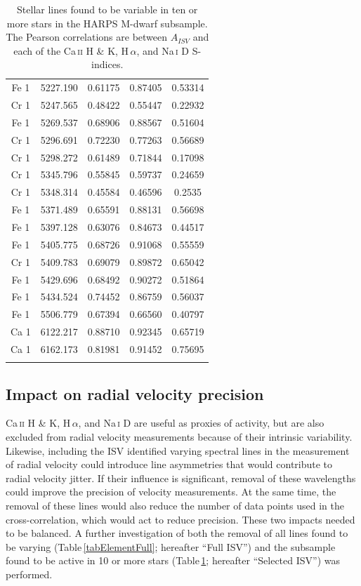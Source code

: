 \begin{longtable}{|c|c|c|c|c|}
Fe 1 & 5227.190 & 0.61175 & 0.87405 & 0.53314 \\   
Cr 1 & 5247.565 & 0.48422 & 0.55447 & 0.22932 \\  
Fe 1 & 5269.537 & 0.68906 & 0.88567 & 0.51604 \\  
Cr 1 & 5296.691 & 0.72230 & 0.77263 & 0.56689 \\   
Cr 1 & 5298.272 & 0.61489 & 0.71844 & 0.17098 \\  
Cr 1 & 5345.796 & 0.55845 & 0.59737 & 0.24659 \\  
Cr 1 & 5348.314 & 0.45584 & 0.46596 & 0.2535 \\   
Fe 1 & 5371.489 & 0.65591 & 0.88131 & 0.56698 \\  
Fe 1 & 5397.128 & 0.63076 & 0.84673 & 0.44517 \\  
Fe 1 & 5405.775 & 0.68726 & 0.91068 & 0.55559 \\  
Cr 1 & 5409.783 & 0.69079 & 0.89872 & 0.65042 \\  
Fe 1 & 5429.696 & 0.68492 & 0.90272 & 0.51864 \\  
Fe 1 & 5434.524 & 0.74452 & 0.86759 & 0.56037 \\  
Fe 1 & 5506.779 & 0.67394 & 0.66560 & 0.40797 \\   
Ca 1 & 6122.217 & 0.88710 & 0.92345 & 0.65719 \\   
Ca 1 & 6162.173 & 0.81981 & 0.91452 & 0.75695 \\ 
\hline
\caption{Stellar lines found to be variable in ten or more stars in the HARPS M-dwarf subsample. The Pearson correlations are between $A_{ISV}$ and each of the Ca\,\textsc{ii} H \& K, H\,\textsc{$\alpha$}, and Na\,\textsc{i} D S-indices.}
\label{tabISVlines}
\end{longtable}

\subsection{Impact on radial velocity precision}
Ca\,\textsc{ii} H \& K, H\,\textsc{$\alpha$}, and Na\,\textsc{i} D are useful as proxies of activity, but are also excluded from radial velocity measurements because of their intrinsic variability. Likewise, including the ISV identified varying spectral lines in the measurement of radial velocity could introduce line asymmetries that would contribute to radial velocity jitter. If their influence is significant, removal of these wavelengths could improve the precision of velocity measurements. At the same time, the removal of these lines would also reduce the number of data points used in the cross-correlation, which would act to reduce precision. These two impacts needed to be balanced. A further investigation of both the removal of all lines found to be varying (Table\,\ref{tabElementFull}; hereafter ``Full ISV'') and the subsample found to be active in 10 or more stars (Table\,\ref{tabISVlines}; hereafter ``Selected ISV'') was performed.

